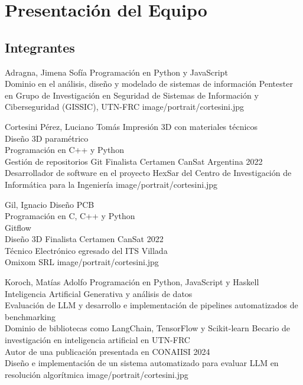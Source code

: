 \section{Presentación del Equipo}

\subsection{Integrantes}

\presentacion
  {Adragna, Jimena Sofía}
  {Programación en Python y JavaScript\\Dominio en el análisis, diseño y modelado de sistemas de información}
  {Pentester en Grupo de Investigación en Seguridad de Sistemas de Información y Ciberseguridad (GISSIC), UTN-FRC}
  {image/portrait/cortesini.jpg}

\presentacion
  {Cortesini Pérez, Luciano Tomás}
  {Impresión 3D con materiales técnicos\\Diseño 3D paramétrico\\Programación en C++ y Python\\Gestión de repositorios Git}
  {Finalista Certamen CanSat Argentina 2022\\Desarrollador de software en el proyecto HexSar del Centro de Investigación de Informática para la Ingeniería}
  {image/portrait/cortesini.jpg}

\presentacion
  {Gil, Ignacio}
  {Diseño PCB\\Programación en C, C++ y Python\\Gitflow\\Diseño 3D}
  {Finalista Certamen CanSat 2022\\Técnico Electrónico egresado del ITS Villada\\Omixom SRL}
  {image/portrait/cortesini.jpg}

\presentacion
  {Koroch, Matías Adolfo}
  {Programación en Python, JavaScript y Haskell\\Inteligencia Artificial Generativa y análisis de datos\\Evaluación de LLM y desarrollo e implementación de pipelines automatizados de benchmarking\\Dominio de bibliotecas como LangChain, TensorFlow y Scikit-learn}
  {Becario de investigación en inteligencia artificial en UTN-FRC\\Autor de una publicación presentada en CONAIISI 2024\\Diseño e implementación de un sistema automatizado para evaluar LLM en resolución algorítmica}
  {image/portrait/cortesini.jpg}

